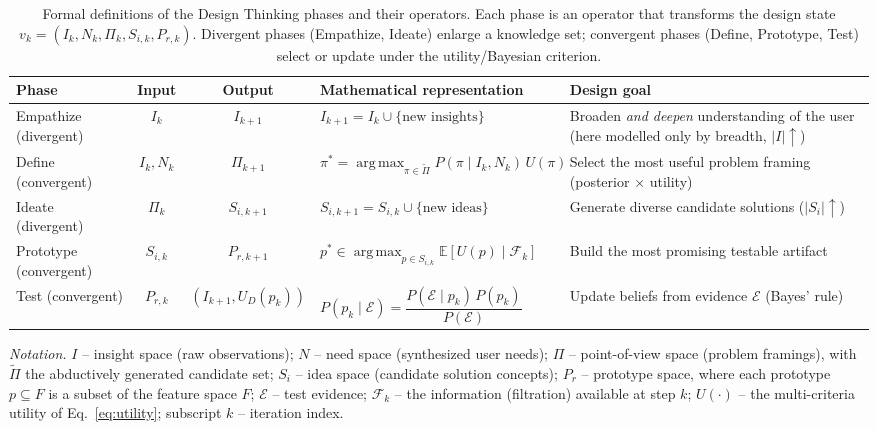 \documentclass[11pt]{article}
\DeclareMathOperator*{\argmax}{arg\,max}
\newcommand{\E}{\mathbb{E}}
\newcommand{\evidence}{\mathcal{E}} %
\newcommand{\filt}{\mathcal{F}}     %
\begin{document}
\begin{table}[h!]
\centering
\caption{Formal definitions of the Design Thinking phases and their operators. Each phase is an operator that transforms the design state $v_k=(I_k,N_k,\Pi_{k},S_{i,k},P_{r,k})$. Divergent phases (Empathize, Ideate) enlarge a knowledge set; convergent phases (Define, Prototype, Test) select or update under the utility/Bayesian criterion.}
\label{tab:formal_definitions}
\setlength{\tabcolsep}{5pt}
\footnotesize
\begin{tabularx}{\textwidth}{@{}l c c >{\raggedright\arraybackslash}X >{\raggedright\arraybackslash}X@{}}
\toprule
\textbf{Phase} & \textbf{Input} & \textbf{Output} & \textbf{Mathematical representation} & \textbf{Design goal} \\
\midrule
Empathize (divergent) &
$I_k$ &
$I_{k+1}$ &
$I_{k+1} = I_k \cup \{\text{new insights}\}$ &
Broaden \emph{and deepen} understanding of the user (here modelled only by breadth, $\lvert I\rvert\!\uparrow$) \\[4pt]

Define (convergent) &
$I_k, N_k$ &
$\Pi_{k+1}$ &
$\pi^{*} = \displaystyle\argmax_{\pi \in \widetilde{\Pi}} P(\pi \mid I_k,N_k)\,U(\pi)$ &
Select the most useful problem framing (posterior $\times$ utility) \\[4pt]

Ideate (divergent) &
$\Pi_{k}$ &
$S_{i,k+1}$ &
$S_{i,k+1} = S_{i,k} \cup \{\text{new ideas}\}$ &
Generate diverse candidate solutions ($\lvert S_i\rvert\!\uparrow$) \\[4pt]

Prototype (convergent) &
$S_{i,k}$ &
$P_{r,k+1}$ &
$p^* \in \displaystyle\argmax_{p \in S_{i,k}} \E[U(p)\mid\filt_k]$ &
Build the most promising testable artifact \\[4pt]

Test (convergent) &
$P_{r,k}$ &
$(I_{k+1}, U_D(p_k))$ &
$P(p_k \mid \evidence) = \dfrac{P(\evidence \mid p_k)\,P(p_k)}{P(\evidence)}$ &
Update beliefs from evidence $\evidence$ (Bayes' rule) \\
\bottomrule
\end{tabularx}

\smallskip
{\footnotesize\textit{Notation.} $I$ -- insight space (raw observations); $N$ -- need space (synthesized user needs); $\Pi$ -- point-of-view space (problem framings), with $\widetilde{\Pi}$ the abductively generated candidate set; $S_i$ -- idea space (candidate solution concepts); $P_r$ -- prototype space, where each prototype $p\subseteq F$ is a subset of the feature space $F$; $\evidence$ -- test evidence; $\filt_k$ -- the information (filtration) available at step $k$; $U(\cdot)$ -- the multi-criteria utility of Eq.~\eqref{eq:utility}; subscript $k$ -- iteration index.\par}
\end{table}
\end{document}
